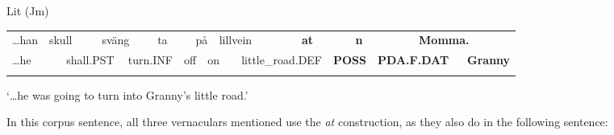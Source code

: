 
\begin{listWWNumileveli}
\item 

\begin{styleExample}
Lit (Jm)

\end{styleExample}

\end{listWWNumileveli}

\begin{tabular}{llllllllllllllllll}
\lsptoprule
…han & \multicolumn{2}{l}{skull

} & \multicolumn{2}{l}{sväng

} & \multicolumn{2}{l}{ta

} & \multicolumn{2}{l}{på

} & \multicolumn{2}{l}{lillvein

} & \multicolumn{2}{l}{{\bfseries at}

} & \multicolumn{2}{l}{{\bfseries n}

} & \multicolumn{2}{l}{{\bfseries Momma.}

} & \\
\multicolumn{2}{l}{…he

} & \multicolumn{2}{l}{shall.PST

} & \multicolumn{2}{l}{turn.INF

} & \multicolumn{2}{l}{off

} & \multicolumn{2}{l}{on

} & \multicolumn{2}{l}{little\_road.DEF

} & \multicolumn{2}{l}{{\bfseries POSS}

} & \multicolumn{2}{l}{{\bfseries PDA.F.DAT}

} & \multicolumn{2}{l}{{\bfseries Granny}

}\\
\lspbottomrule
\end{tabular}

\begin{styleTranslation}
‘…he was going to turn into Granny’s little road.’

\end{styleTranslation}

\begin{styleBodyTextFirst}
In this corpus sentence, all three vernaculars mentioned use the \textit{at} construction, as they also do in the following sentence:

\end{styleBodyTextFirst}

